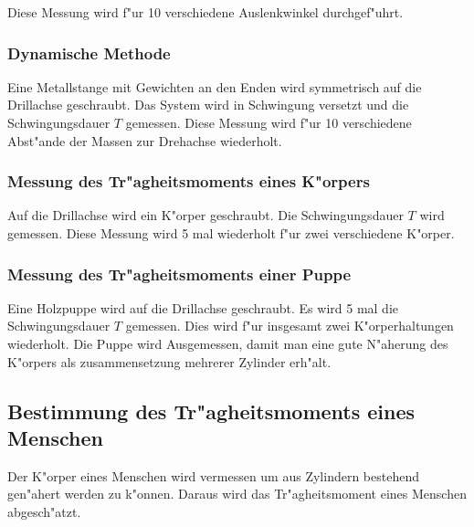 Diese Messung wird f"ur 10 verschiedene Auslenkwinkel durchgef"uhrt.

\subsubsection{Dynamische Methode} %
\label{sub:dynamische_methode}
 
Eine Metallstange mit Gewichten an den Enden wird symmetrisch auf die Drillachse geschraubt. Das System wird in Schwingung versetzt und die Schwingungsdauer $T$ gemessen. Diese Messung wird f"ur 10 verschiedene Abst"ande der Massen zur Drehachse wiederholt.

\subsubsection{Messung des Tr"agheitsmoments eines K"orpers} %
\label{sub:tr_agheitsmoment_verschiedener_k_orper}

Auf die Drillachse wird ein K"orper geschraubt.
Die Schwingungsdauer $T$ wird gemessen.
Diese Messung wird 5 mal wiederholt f"ur zwei verschiedene K"orper.

\subsubsection{Messung des Tr"agheitsmoments einer Puppe} %
\label{sub:messung_des_tr_agheitsmoments_einer_puppe}

Eine Holzpuppe wird auf die Drillachse geschraubt.
Es wird 5 mal die Schwingungsdauer $T$ gemessen.
Dies wird f"ur insgesamt zwei K"orperhaltungen wiederholt.
Die Puppe wird Ausgemessen, damit man eine gute N"aherung des K"orpers als zusammensetzung mehrerer Zylinder erh"alt.

\subsection{Bestimmung des Tr"agheitsmoments eines Menschen} %
\label{sub:bestimmung_des_tr_agheitsmoments_eines_menschen}

Der K"orper eines Menschen wird vermessen um aus Zylindern bestehend gen"ahert werden zu k"onnen. Daraus wird das Tr"agheitsmoment eines Menschen abgesch"atzt.